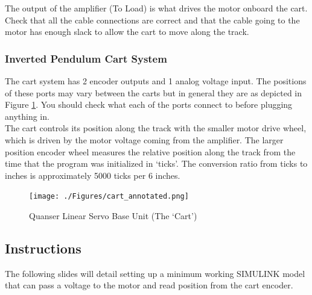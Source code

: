 \documentclass[11pt,letterpaper]{article}
\begin{document}
The output of the amplifier (To Load) is what drives the motor onboard the cart. Check that all the cable connections are correct and that the cable going to the motor has enough slack to allow the cart to move along the track. 

\subsubsection*{Inverted Pendulum Cart System}
The cart system has 2 encoder outputs and 1 analog voltage input. The positions of these ports may vary between the carts but in general they are as depicted in Figure \ref{fig:cart}. You should check what each of the ports connect to before plugging anything in. \\

The cart controls its position along the track with the smaller motor drive wheel, which is driven by the motor voltage coming from the amplifier. The larger position encoder wheel measures the relative position along the track from the time that the program was initialized in `ticks'. The conversion ratio from ticks to inches is approximately 5000 ticks per 6 inches.
\begin{figure}[H]
  \centering
  \texttt{[image: ./Figures/cart\_annotated.png]}
  \caption{Quanser Linear Servo Base Unit (The `Cart')}
  \label{fig:cart}
\end{figure}



\subsection*{Instructions}
The following slides will detail setting up a minimum working SIMULINK model that can pass a voltage to the motor and read position from the cart encoder.
\end{document}
